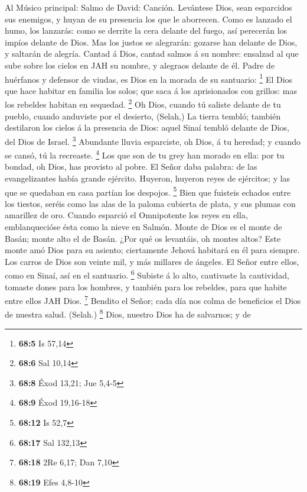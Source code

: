  Al Músico principal: Salmo de David: Canción. Levántese
Dios, sean esparcidos sus enemigos, y huyan de su presencia los que le
aborrecen.  Como es lanzado el humo, los lanzarás: como se
derrite la cera delante del fuego, así perecerán los impíos delante de
Dios.  Mas los justos se alegrarán: gozarse han delante de
Dios, y saltarán de alegría.  Cantad á Dios, cantad salmos á
su nombre: ensalzad al que sube sobre los cielos en JAH su nombre, y
alegraos delante de él.  Padre de huérfanos y defensor de
viudas, es Dios en la morada de su santuario: \footnote{\textbf{68:5} Is
  57,14}  El Dios que hace habitar en familia los solos; que
saca á los aprisionados con grillos: mas los rebeldes habitan en
sequedad. \footnote{\textbf{68:6} Sal 10,14}  Oh Dios,
cuando tú saliste delante de tu pueblo, cuando anduviste por el
desierto, (Selah,)  La tierra tembló; también destilaron los
cielos á la presencia de Dios: aquel Sinaí tembló delante de Dios, del
Dios de Israel. \footnote{\textbf{68:8} Éxod 13,21; Jue 5,4-5}
 Abundante lluvia esparciste, oh Dios, á tu heredad; y
cuando se cansó, tú la recreaste. \footnote{\textbf{68:9} Éxod 19,16-18}
 Los que son de tu grey han morado en ella: por tu bondad,
oh Dios, has provisto al pobre.  El Señor daba palabra: de
las evangelizantes había grande ejército.  Huyeron, huyeron
reyes de ejércitos; y las que se quedaban en casa partían los despojos.
\footnote{\textbf{68:12} Is 52,7}  Bien que fuisteis
echados entre los tiestos, seréis como las alas de la paloma cubierta de
plata, y sus plumas con amarillez de oro.  Cuando esparció
el Omnipotente los reyes en ella, emblanquecióse ésta como la nieve en
Salmón.  Monte de Dios es el monte de Basán; monte alto el
de Basán.  ¿Por qué os levantáis, oh montes altos? Este
monte amó Dios para su asiento; ciertamente Jehová habitará en él para
siempre.  Los carros de Dios son veinte mil, y más millares
de ángeles. El Señor entre ellos, como en Sinaí, así en el santuario.
\footnote{\textbf{68:17} Sal 132,13}  Subiste á lo alto,
cautivaste la cautividad, tomaste dones para los hombres, y también para
los rebeldes, para que habite entre ellos JAH Dios. \footnote{\textbf{68:18}
  2Re 6,17; Dan 7,10}  Bendito el Señor; cada día nos colma
de beneficios el Dios de nuestra salud. (Selah.) \footnote{\textbf{68:19}
  Efes 4,8-10}  Dios, nuestro Dios ha de salvarnos; y de
